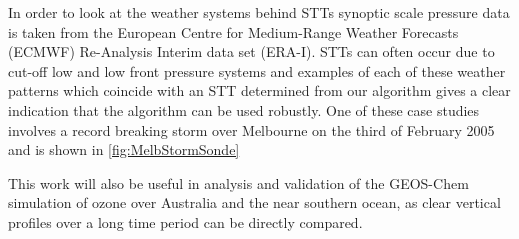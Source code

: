 In order to look at the weather systems behind STTs synoptic scale pressure data is taken from the European Centre for Medium-Range Weather Forecasts (ECMWF) Re-Analysis Interim data set (ERA-I).
STTs can often occur due to cut-off low and low front pressure systems and examples of each of these weather patterns which coincide with an STT determined from our algorithm gives a clear indication that the algorithm can be used robustly.
One of these case studies involves a record breaking storm over Melbourne on the third of February 2005 and is shown in \ref{fig:MelbStormSonde}

This work will also be useful in analysis and validation of the GEOS-Chem simulation of ozone over Australia and the near southern ocean, as clear vertical profiles over a long time period can be directly compared.